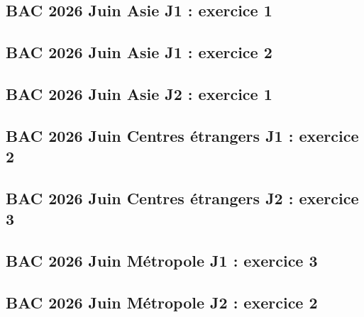 \documentclass[lang=fr,edition=teacher,layout=sheet]{mxbook}
\begin{document}
\begingroup\endgroup
\par\bigskip
{}\subsection*{BAC 2026 Juin Asie J1 : exercice 1}
\begingroup\endgroup
\par\bigskip
{}\subsection*{BAC 2026 Juin Asie J1 : exercice 2}
\begingroup\endgroup
\par\bigskip
{}\subsection*{BAC 2026 Juin Asie J2 : exercice 1}
\begingroup\endgroup
\par\bigskip
{}\subsection*{BAC 2026 Juin Centres étrangers J1 : exercice 2}
\begingroup\endgroup
\par\bigskip
{}\subsection*{BAC 2026 Juin Centres étrangers J2 : exercice 3}
\begingroup\endgroup
\par\bigskip
{}\subsection*{BAC 2026 Juin Métropole J1 : exercice 3}
\begingroup\endgroup
\par\bigskip
{}\subsection*{BAC 2026 Juin Métropole J2 : exercice 2}
\end{document}
